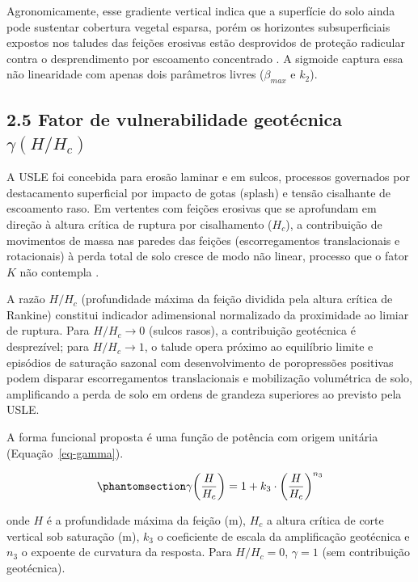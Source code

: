 \documentclass[
  brazilian,
  authoryear,
  preprint]{elsarticle}
\begin{document}
Agronomicamente, esse gradiente vertical indica que a superfície do solo
ainda pode sustentar cobertura vegetal esparsa, porém os horizontes
subsuperficiais expostos nos taludes das feições erosivas estão
desprovidos de proteção radicular contra o desprendimento por escoamento
concentrado \citep{vannoppen_2015}. A sigmoide captura essa não
linearidade com apenas dois parâmetros livres (\(\beta_{max}\) e
\(k_2\)).

\subsection{\texorpdfstring{2.5 Fator de vulnerabilidade geotécnica
\(\gamma(H/H_c)\)}{2.5 Fator de vulnerabilidade geotécnica \textbackslash gamma(H/H\_c)}}\label{fator-de-vulnerabilidade-geotuxe9cnica-gammahh_c}

A USLE foi concebida para erosão laminar e em sulcos, processos
governados por destacamento superficial por impacto de gotas (splash) e
tensão cisalhante de escoamento raso. Em vertentes com feições erosivas
que se aprofundam em direção à altura crítica de ruptura por
cisalhamento (\(H_c\)), a contribuição de movimentos de massa nas
paredes das feições (escorregamentos translacionais e rotacionais) à
perda total de solo cresce de modo não linear, processo que o fator
\(K\) não contempla \citep{poesen_et_al_2003, sidorchuk_2006}.

A razão \(H/H_c\) (profundidade máxima da feição dividida pela altura
crítica de Rankine) constitui indicador adimensional normalizado da
proximidade ao limiar de ruptura. Para \(H/H_c \to 0\) (sulcos rasos), a
contribuição geotécnica é desprezível; para \(H/H_c \to 1\), o talude
opera próximo ao equilíbrio limite e episódios de saturação sazonal com
desenvolvimento de poropressões positivas podem disparar escorregamentos
translacionais e mobilização volumétrica de solo, amplificando a perda
de solo em ordens de grandeza superiores ao previsto pela USLE.

A forma funcional proposta é uma função de potência com origem unitária
(Equação~\ref{eq-gamma}).

\begin{equation}\phantomsection\label{eq-gamma}{
\gamma\!\left(\dfrac{H}{H_c}\right) = 1 + k_3 \cdot \left(\dfrac{H}{H_c}\right)^{n_3}
}\end{equation}

onde \(H\) é a profundidade máxima da feição (m), \(H_c\) a altura
crítica de corte vertical sob saturação (m), \(k_3\) o coeficiente de
escala da amplificação geotécnica e \(n_3\) o expoente de curvatura da
resposta. Para \(H/H_c = 0\), \(\gamma = 1\) (sem contribuição
geotécnica).
\end{document}
